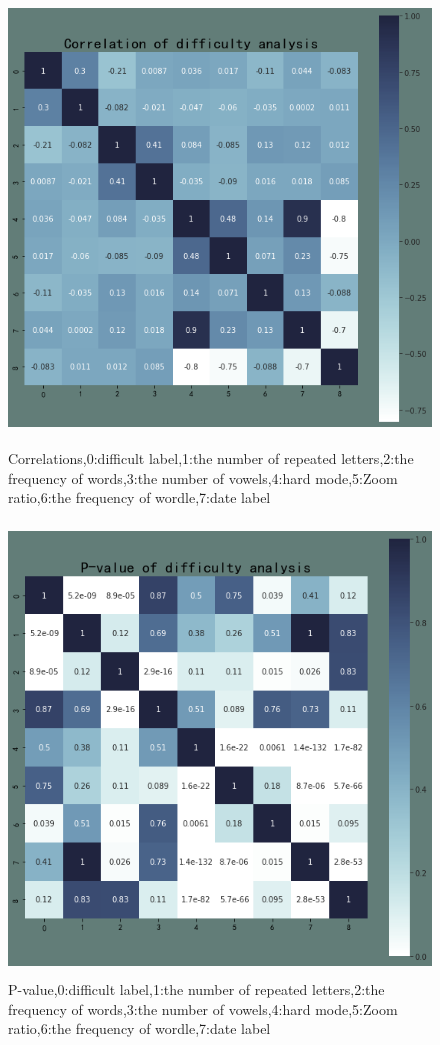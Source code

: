 \documentclass[12pt]{article}
\begin{document}
\begin{figure}
	
	\centering
	
	\includegraphics[height=12cm, width=12cm]{COR_dif.png}
	\caption{Correlations,0:difficult label,1:the number of repeated letters,2:the frequency of words,3:the number of vowels,4:hard mode,5:Zoom ratio,6:the frequency of wordle,7:date label}
\end{figure}
	
\begin{figure}[htbp]
	
	\centering
	\includegraphics[height=12cm, width=12cm]{PER_dif.png}
	\caption{P-value,0:difficult label,1:the number of repeated letters,2:the frequency of words,3:the number of vowels,4:hard mode,5:Zoom ratio,6:the frequency of wordle,7:date label}
	
\end{figure}
\end{document}
